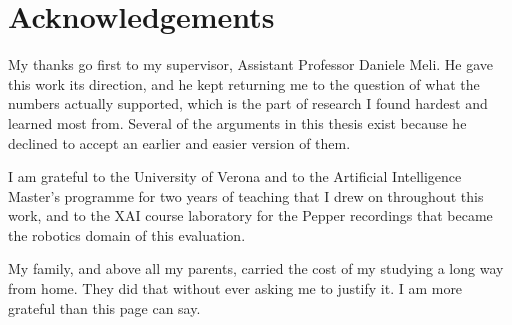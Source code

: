 \chapter*{Acknowledgements}

My thanks go first to my supervisor, Assistant Professor Daniele Meli. He gave this
work its direction, and he kept returning me to the question of what the numbers
actually supported, which is the part of research I found hardest and learned most
from. Several of the arguments in this thesis exist because he declined to accept an
earlier and easier version of them.

I am grateful to the University of Verona and to the Artificial Intelligence Master's
programme for two years of teaching that I drew on throughout this work, and to the
XAI course laboratory for the Pepper recordings that became the robotics domain of
this evaluation.

My family, and above all my parents, carried the cost of my studying a long way from
home. They did that without ever asking me to justify it. I am more grateful than
this page can say.
